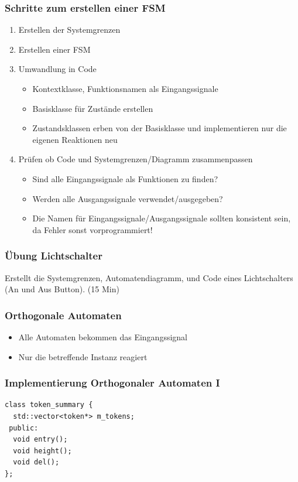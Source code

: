 \documentclass{beamer}
\begin{document}
\begin{frame}
 \frametitle{Schritte zum erstellen einer FSM}
 \begin{enumerate}
  \item Erstellen der Systemgrenzen
  \item Erstellen einer FSM
  \item Umwandlung in Code
  \begin{itemize}
   \item Kontextklasse, Funktionsnamen als Eingangssignale
   \item Basisklasse f\"ur Zust\"ande erstellen
   \item Zustandsklassen erben von der Basisklasse und implementieren nur die eigenen Reaktionen neu
  \end{itemize}
  \item Pr\"ufen ob Code und Systemgrenzen/Diagramm zusammenpassen
  \begin{itemize}
   \item Sind alle Eingangssignale als Funktionen zu finden?
   \item Werden alle Ausgangssignale verwendet/ausgegeben?
   \item Die Namen f\"ur Eingangssignale/Ausgangssignale sollten konsistent sein, da Fehler sonst vorprogrammiert!
  \end{itemize}
 \end{enumerate}
\end{frame}

\begin{frame}
 \frametitle{\"Ubung Lichtschalter}
 Erstellt die Systemgrenzen, Automatendiagramm, und Code eines Lichtschalters (An und Aus Button). (15 Min)
\end{frame}

\begin{frame}
 \frametitle{Orthogonale Automaten}
 \begin{itemize}
  \item Alle Automaten bekommen das Eingangssignal
  \item Nur die betreffende Instanz reagiert
 \end{itemize}
\end{frame}

\begin{frame}[fragile]
 \frametitle{Implementierung Orthogonaler Automaten I}
 \begin{lstlisting}
class token_summary {
  std::vector<token*> m_tokens;
 public:
  void entry();
  void height();
  void del();
};
 \end{lstlisting}
\end{frame}
\end{document}
